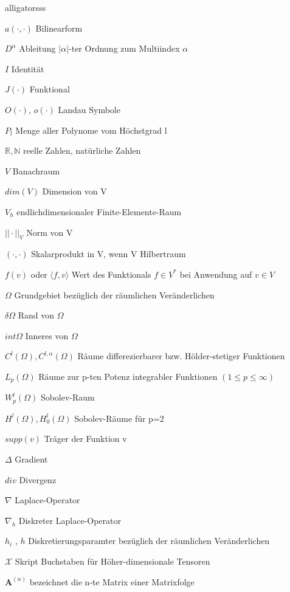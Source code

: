 \documentclass[12pt,a4paper]{scrartcl}
\numberwithin{equation}{section}
\begin{document}
\begin{labeling}{alligatorsss \quad \quad }
\item [$a(\cdot,\cdot)$] Bilinearform
\item [$D^{\alpha}$] Ableitung $|\alpha|$-ter Ordnung zum Multiindex $\alpha$
\item [$I$] Identität
\item [$J(\cdot)$] Funktional
\item [$O(\cdot)$, $o(\cdot)$] Landau Symbole
\item [$P_l$] Menge aller Polynome vom Höchstgrad l
\item [$\mathbb{R},\mathbb{N}$] reelle Zahlen, natürliche Zahlen
\item [$V$] Banachraum
\item [$dim(V)$] Dimension von V
\item [$V_h$] endlichdimensionaler Finite-Elemente-Raum
\item [$||\cdot||_V$] Norm von V
\item [$(\cdot,\cdot)$] Skalarprodukt in V, wenn V Hilbertraum
\item [$f(v)$ oder $\langle f , v \rangle$] Wert des Funktionals $f \in V^{*}$ bei Anwendung auf $v \in V$
\item [$\Omega$] Grundgebiet bezüglich der räumlichen Veränderlichen
\item [$\delta \Omega$] Rand von $\Omega$
\item [$int \Omega$] Inneres von $\Omega$
\item [$C^{l}(\Omega), C^{l,\alpha}(\Omega)$] Räume differezierbarer bzw. Hölder-stetiger Funktionen
\item [$L_p(\Omega)$] Räume zur p-ten Potenz integrabler Funktionen $(1 \leq p \leq \infty)$
\item [$W_p^l(\Omega)$] Sobolev-Raum
\item [$H^l(\Omega),H_0^l(\Omega)$] Sobolev-Räume für p=2
\item [$supp(v)$] Träger der Funktion v
\item [$\Delta$] Gradient
\item [$div$] Divergenz
\item [$\nabla$] Laplace-Operator
\item [$\nabla_h$] Diskreter Laplace-Operator
\item [$h_i$ , $h$] Diskretierungsparamter bezüglich der räumlichen Veränderlichen
\item [$\pmb{\mathscr{X}}$] Skript Buchstaben für Höher-dimensionale Tensoren
\item [$\textbf{A}^{(n)}$] bezeichnet die n-te Matrix einer Matrixfolge

\end{labeling}
\end{document}
